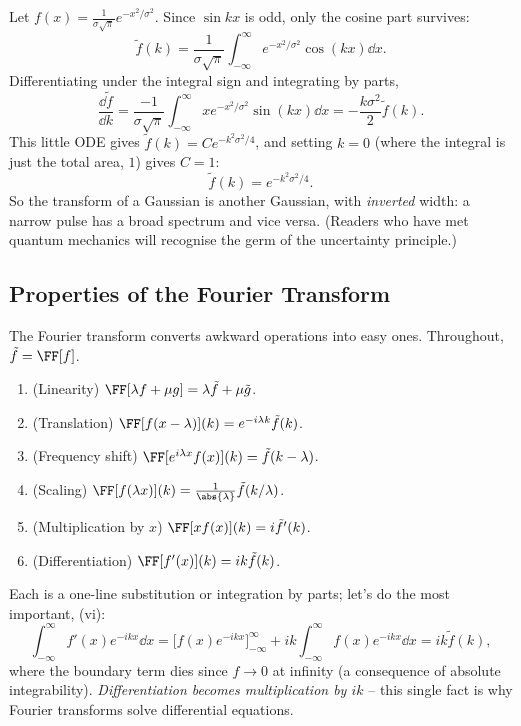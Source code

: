 \begin{example}
    Let $f(x) = \frac{1}{\sigma \sqrt{\pi}} e^{-x^2/\sigma^2}$. Since $\sin kx$ is odd, only the cosine part survives:
    $$
    \tilde{f}(k) = \frac{1}{\sigma \sqrt{\pi}}\int_{-\infty}^{\infty} e^{-x^2/\sigma^2} \cos (kx) \dd x.
    $$
    Differentiating under the integral sign and integrating by parts,
    $$
    \frac{\dd \tilde f}{\dd k} = \frac{-1}{\sigma \sqrt{\pi}} \int_{-\infty}^{\infty} x e^{-x^2/\sigma^2} \sin(kx) \dd x = -\frac{k \sigma^2}{2} \tilde{f}(k).
    $$
    This little ODE gives $\tilde{f}(k) = C e^{-k^2 \sigma^2/4}$, and setting $k = 0$ (where the integral is just the total area, $1$) gives $C = 1$:
    $$
    \tilde{f}(k) = e^{-k^2 \sigma^2 / 4}.
    $$
    So the transform of a Gaussian is another Gaussian, with \emph{inverted} width: a narrow pulse has a broad spectrum and vice versa. (Readers who have met quantum mechanics will recognise the germ of the uncertainty principle.)
\end{example}

\subsection{Properties of the Fourier Transform}

The Fourier transform converts awkward operations into easy ones. Throughout, $\tilde{f} = \FF[f]$.
\begin{enumerate}[label=(\roman*)]
    \item (Linearity) $\FF[\lambda f + \mu g] = \lambda \tilde f + \mu \tilde g$.
    \item (Translation) $\FF[f(x - \lambda)](k) = e^{-i \lambda k} \tilde{f}(k)$.
    \item (Frequency shift) $\FF[e^{i \lambda x} f(x)](k) = \tilde{f}(k - \lambda)$.
    \item (Scaling) $\FF[f(\lambda x)](k) = \frac{1}{\abs{\lambda}} \tilde{f}(k/\lambda)$.
    \item (Multiplication by $x$) $\FF[x f(x)](k) = i \tilde{f}'(k)$.
    \item (Differentiation) $\FF[f'(x)](k) = ik \tilde{f}(k)$.
\end{enumerate}
Each is a one-line substitution or integration by parts; let's do the most important, (vi):
$$
\int_{-\infty}^{\infty} f'(x) e^{-ikx}\dd x = \Big[f(x) e^{-ikx}\Big]_{-\infty}^{\infty} + ik \int_{-\infty}^{\infty} f(x) e^{-ikx} \dd x = i k \tilde{f}(k),
$$
where the boundary term dies since $f \to 0$ at infinity (a consequence of absolute integrability). \emph{Differentiation becomes multiplication by $ik$} -- this single fact is why Fourier transforms solve differential equations.

